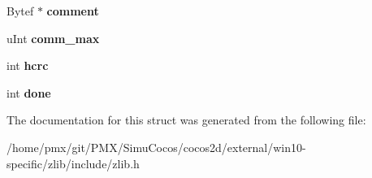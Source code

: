 \begin{DoxyCompactItemize}
Bytef $\ast$ {\bfseries comment}
\item 
\mbox{\label{structgz__header__s_aa0529f45e5c08b3009cfc2a61a86aea0}} 
u\+Int {\bfseries comm\+\_\+max}
\item 
\mbox{\label{structgz__header__s_a29fa8de3acff8d8c7bad61dc924d8564}} 
int {\bfseries hcrc}
\item 
\mbox{\label{structgz__header__s_ab8fd11f59b76a7d031e24bede8679d9d}} 
int {\bfseries done}
\end{DoxyCompactItemize}


The documentation for this struct was generated from the following file\+:\begin{DoxyCompactItemize}
\item 
/home/pmx/git/\+P\+M\+X/\+Simu\+Cocos/cocos2d/external/win10-\/specific/zlib/include/zlib.\+h\end{DoxyCompactItemize}
